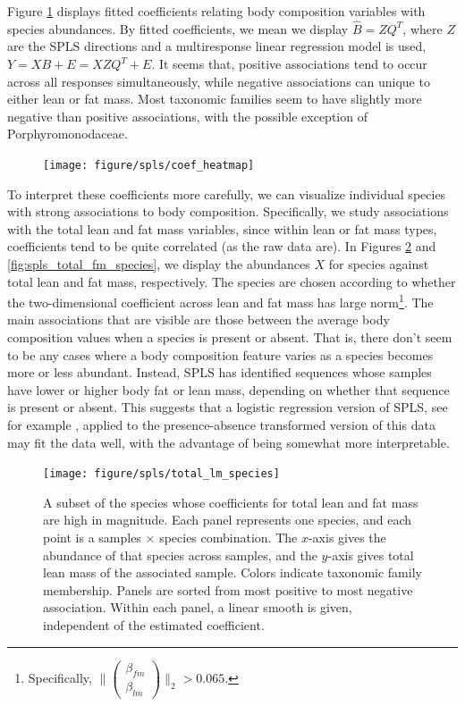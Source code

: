 \documentclass[14pt]{extarticle}
\begin{document}
Figure \ref{fig:spls_coef_heatmap} displays fitted coefficients relating body
composition variables with species abundances. By fitted coefficients, we mean
we display $\hat{B} = ZQ^T$, where $Z$ are the SPLS directions and a
multiresponse linear regression model is used, $Y = XB + E = XZQ^T + E$. It
seems that, positive associations tend to occur across all responses
simultaneously, while negative associations can unique to either lean or fat
mass. Most taxonomic families seem to have slightly more negative than positive
associations, with the possible exception of Porphyromonodaceae.

\begin{figure}
  \centering
  \texttt{[image: figure/spls/coef\_heatmap]}
  \caption{\label{fig:spls_coef_heatmap} }
\end{figure}

To interpret these coefficients more carefully, we can visualize individual
species with strong associations to body composition. Specifically, we study
associations with the total lean and fat mass variables, since within lean or
fat mass types, coefficients tend to be quite correlated (as the raw data are).
In Figures \ref{fig:spls_total_lm_species} and \ref{fig:spls_total_fm_species},
we display the abundances $X$ for species against total lean and fat mass,
respectively. The species are chosen according to whether the two-dimensional
coefficient across lean and fat mass has large norm\footnote{Specifically,
  $\| \begin{pmatrix} \beta_{fm} \\ \beta_{lm} \end{pmatrix} \|_{2} > 0.065$.}.
The main associations that are visible are those between the average body
composition values when a species is present or absent. That is, there don't
seem to be any cases where a body composition feature varies as a species
becomes more or less abundant. Instead, SPLS has identified sequences whose
samples have lower or higher body fat or lean mass, depending on whether that
sequence is present or absent. This suggests that a logistic regression version
of SPLS, see for example \citep{chung2010sparse}, applied to the
presence-absence transformed version of this data may fit the data well, with
the advantage of being somewhat more interpretable.

\begin{figure}
  \centering
  \texttt{[image: figure/spls/total\_lm\_species]}
  \caption{A subset of the species whose coefficients for total lean and fat
    mass are high in magnitude. Each panel represents one species, and each
    point is a samples $\times$ species combination. The $x$-axis gives the
    abundance of that species across samples, and the $y$-axis gives total lean
    mass of the associated sample. Colors indicate taxonomic family membership.
    Panels are sorted from most positive to most negative association. Within
    each panel, a linear smooth is given, independent of the estimated
    coefficient.
    \label{fig:spls_total_lm_species} }
\end{figure}
\end{document}
